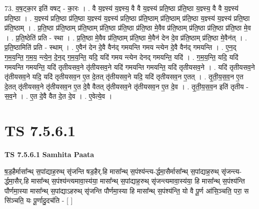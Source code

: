 \documentclass[17pt]{extarticle}
\begin{document}
73. व॒ष॒ट्का॒र इति॑ वषट् - का॒रः । . वै य॒ज्ञ्स्य॑ य॒ज्ञ्स्य॒ वै वै य॒ज्ञ्स्य॑ प्रति॒ष्ठा प्र॑ति॒ष्ठा य॒ज्ञ्स्य॒ वै वै य॒ज्ञ्स्य॑ प्रति॒ष्ठा । . य॒ज्ञ्स्य॑ प्रति॒ष्ठा प्र॑ति॒ष्ठा य॒ज्ञ्स्य॑ य॒ज्ञ्स्य॑ प्रति॒ष्ठा प्र॑ति॒ष्ठाम् प्र॑ति॒ष्ठाम् प्र॑ति॒ष्ठा य॒ज्ञ्स्य॑ य॒ज्ञ्स्य॑ प्रति॒ष्ठा प्र॑ति॒ष्ठाम् । . प्र॒ति॒ष्ठा प्र॑ति॒ष्ठाम् प्र॑ति॒ष्ठाम् प्र॑ति॒ष्ठा प्र॑ति॒ष्ठा प्र॑ति॒ष्ठा मे॒वैव प्र॑ति॒ष्ठाम् प्र॑ति॒ष्ठा प्र॑ति॒ष्ठा प्र॑ति॒ष्ठा मे॒व । . प्र॒ति॒ष्ठेति॑ प्रति - स्था । . प्र॒ति॒ष्ठा मे॒वैव प्र॑ति॒ष्ठाम् प्र॑ति॒ष्ठा मे॒वैन॑ देन दे॒व प्र॑ति॒ष्ठाम् प्र॑ति॒ष्ठा मे॒वैन॑त् । . प्र॒ति॒ष्ठामिति॑ प्रति - स्थाम् । . ए॒वैन॑ देन दे॒वै वैन॑द् गमयन्ति गमय न्त्येन दे॒वै वैन॑द् गमयन्ति । . ए॒न॒द् ग॒म॒य॒न्ति॒ ग॒म॒य॒ न्त्ये॒न॒ दे॒न॒द् ग॒म॒य॒न्ति॒ यदि॒ यदि॑ गमय न्त्येन देनद् गमयन्ति॒ यदि॑ । . ग॒म॒य॒न्ति॒ यदि॒ यदि॑ गमयन्ति गमयन्ति॒ यदि॑ तृतीयसव॒ने तृ॑तीयसव॒ने यदि॑ गमयन्ति गमयन्ति॒ यदि॑ तृतीयसव॒ने । . यदि॑ तृतीयसव॒ने तृ॑तीयसव॒ने यदि॒ यदि॑ तृतीयसव॒न ए॒त दे॒तत् तृ॑तीयसव॒ने यदि॒ यदि॑ तृतीयसव॒न ए॒तत् । . तृ॒ती॒य॒स॒व॒न ए॒त दे॒तत् तृ॑तीयसव॒ने तृ॑तीयसव॒न ए॒त दे॒वै वैतत् तृ॑तीयसव॒ने तृ॑तीयसव॒न ए॒त दे॒व । . तृ॒ती॒य॒स॒व॒न इति॑ तृतीय - स॒व॒ने । . ए॒त दे॒वै वैत दे॒त दे॒व । . ए॒वेत्ये॒व । \newline
\pagebreak
{}

\section{ TS 7.5.6.1 }

\textbf{TS 7.5.6.1 } \newline
\textbf{Samhita Paata} \newline

ष॒ड॒हैर्मासा᳚न्थ् स॒पांद्याह॒रुथ् सृ॑जन्ति षड॒हैर्.हि मासा᳚न्थ् स॒पंश्य॑न्त्य-र्द्धमा॒सैर्मासा᳚न्थ् स॒पांद्याह॒रुथ् सृ॑जन्त्य-र्द्धमा॒सैर्.हि मासा᳚न्थ् स॒पंश्य॑न्त्यमावा॒स्य॑या॒ मासा᳚न्थ् स॒पांद्याह॒रुथ् सृ॑जन्त्यमावा॒स्य॑या॒ हि मासा᳚न्थ् स॒पंश्य॑न्ति पौर्णमा॒स्या मासा᳚न्थ् स॒पांद्याऽहरुथ् सृ॑जन्ति पौर्णमा॒स्या हि मासा᳚न्थ् स॒पंश्य॑न्ति॒ यो वै पू॒र्ण आ॑सि॒ञ्चति॒ परा॒ स सि॑ञ्चति॒ यः पू॒र्णादु॒दच॑ति - [  ] \newline
\end{document}

